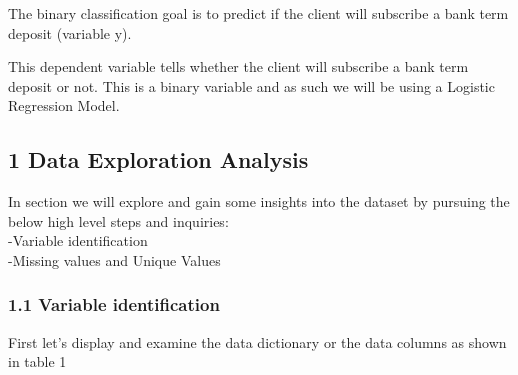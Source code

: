 \documentclass[english,man]{apa6}
\begin{document}
The binary classification goal is to predict if the client will
subscribe a bank term deposit (variable y).

This dependent variable tells whether the client will subscribe a bank
term deposit or not. This is a binary variable and as such we will be
using a Logistic Regression Model.

\subsection{1 Data Exploration
Analysis}\label{data-exploration-analysis}

In section we will explore and gain some insights into the dataset by
pursuing the below high level steps and inquiries:\\
-Variable identification\\
-Missing values and Unique Values\\

\subsubsection{1.1 Variable
identification}\label{variable-identification}

First let's display and examine the data dictionary or the data columns
as shown in table 1
\end{document}
